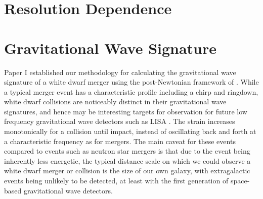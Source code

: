 \documentclass[twocolumn,numberedappendix]{../aastex6}
\begin{document}




\section{Resolution Dependence}
\label{sec:resolution}



\section{Gravitational Wave Signature}
\label{sec:gwsignature}

Paper I established our methodology for calculating the gravitational wave signature
of a white dwarf merger using the post-Newtonian framework of \citet{blanchet:1990}.
While a typical merger event has a characteristic profile including a chirp and ringdown,
white dwarf collisions are noticeably distinct in their gravitational wave signatures, and
hence may be interesting targets for observation for future low frequency gravitational
wave detectors such as LISA \citep{eLISA}. The strain increases monotonically for a collision until impact,
instead of oscillating back and forth at a characteristic frequency as for mergers.
The main caveat for these events compared to events
such as neutron star mergers is that due to the event being inherently less energetic,
the typical distance scale on which we could observe a white dwarf merger or collision
is the size of our own galaxy, with extragalactic events being unlikely to be
detected, at least with the first generation of space-based gravitational wave
detectors.
\end{document}
